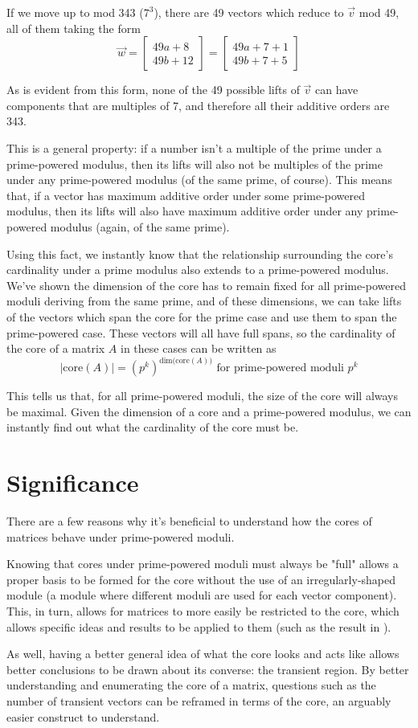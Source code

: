 \documentclass[a4paper, 12pt, reqno]{amsart}
\newcommand{\ssection}[1]{\vspace{1cm}\section{#1}}
\begin{document}
	If we move up to mod 343 ($7^{3}$), there are 49 vectors which reduce to $\vec{v}$ mod 49, 
	all of them taking the form 
	\[
	\vec{w} =
		\begin{bmatrix}
			49a + 8 \\
			49b + 12
		\end{bmatrix}
		=
		\begin{bmatrix}
			49a + 7 + 1 \\
			49b + 7 + 5
		\end{bmatrix}
	\]
	
	As is evident from this form, none of the 49 possible lifts of $\vec{v}$ can have components 
	that are multiples of 7, and therefore all their additive orders are 343. 
	
	This is a general property: if a number isn't a multiple of the prime under a prime-powered
	modulus, then its lifts will also not be multiples of the prime under any prime-powered
	modulus (of the same prime, of course). This means that, if a vector has maximum additive
	order under some prime-powered modulus, then its lifts will also have maximum additive
	order under any prime-powered modulus (again, of the same prime).
	
	Using this fact, we instantly know that the relationship surrounding the core's cardinality
	under a prime modulus also extends to a prime-powered modulus. We've shown the dimension of 
	the core has to remain fixed for all prime-powered moduli deriving from the same prime, and
	of these dimensions, we can take lifts of the vectors which span the core for the prime case
	and use them to span the prime-powered case. These vectors will all have full spans, so the
	cardinality of the core of a matrix $A$ in these cases can be written as
	\[
		|\text{core}(A)| = (p^{k})^{\text{dim(core}(A))} \text{ for prime-powered moduli } p^{k}
	\]
	
	This tells us that, for all prime-powered moduli, the size of the core will always be
	maximal. Given the dimension of a core and a prime-powered modulus, we can instantly
	find out what the cardinality of the core must be.
	
	\ssection{Significance}
	There are a few reasons why it's beneficial to understand how the cores of matrices
	behave under prime-powered moduli.
	
	Knowing that cores under prime-powered moduli must always be "full" allows a proper
	basis to be formed for the core without the use of an irregularly-shaped module
	(a module where different moduli are used for each vector component). This, in turn,
	allows for matrices to more easily be restricted to the core, which allows specific
	ideas and results to be applied to them (such as the result in \citet{Strong2022maximal}).
	
	As well, having a better general idea of what the core looks and acts like allows better
	conclusions to be drawn about its converse: the transient region. By better understanding
	and enumerating the core of a matrix, questions such as the number of transient vectors
	can be reframed in terms of the core, an arguably easier construct to understand.
	
	
	
\end{document}
